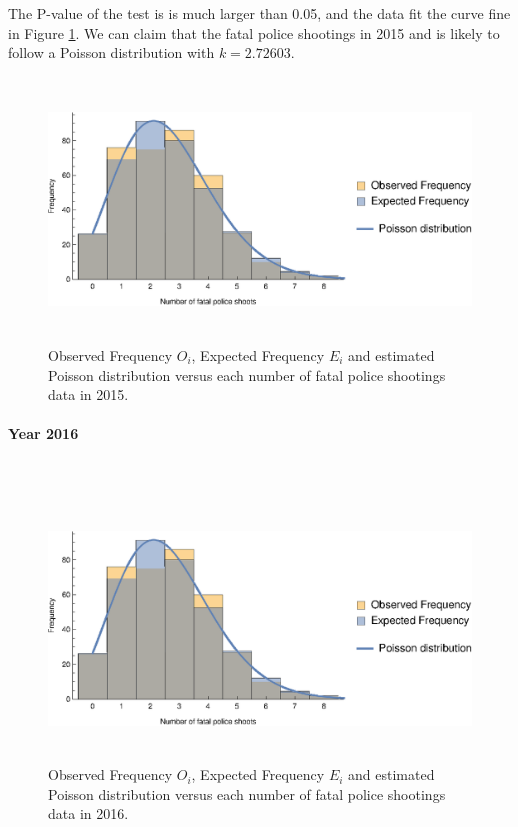 \documentclass[conf]{new-aiaa}
\begin{document}
The P-value of the test is is much larger than 0.05, and the data fit the curve fine in Figure \ref{fig:q3-2015-exp}. We can claim that the fatal police shootings in 2015 and is likely to follow a Poisson distribution with $k=2.72603.$

\begin{figure}[!htbp]
\centering
\includegraphics[height=7cm]{q3/q3-2015-exp.eps}
\caption{Observed Frequency $O_i$, Expected Frequency $E_i$ and estimated Poisson distribution versus each number of fatal police shootings data in 2015.}
\label{fig:q3-2015-exp}
\end{figure}

\paragraph{Year 2016}\ 

\begin{figure}[!htbp]
\centering
\includegraphics[height=7cm]{q3/q3-2016-exp.eps}
\caption{Observed Frequency $O_i$, Expected Frequency $E_i$ and estimated Poisson distribution versus each number of fatal police shootings data in 2016.}
\label{fig:q3-2016-exp}
\end{figure}
\end{document}
